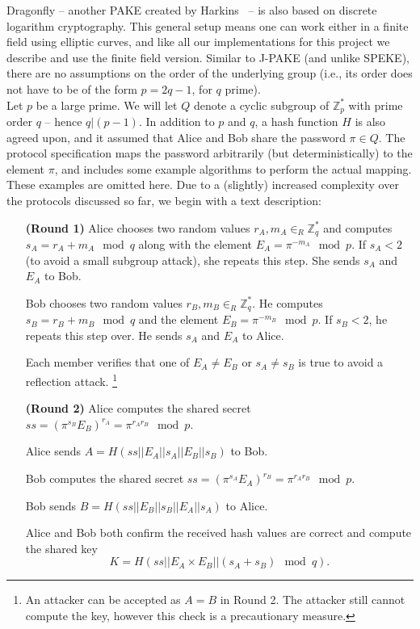 
Dragonfly -- another PAKE created by Harkins~\cite{Ha15} -- is also based on discrete logarithm cryptography.  This general setup means one can work  either in a finite field using elliptic curves, and like all our implementations for this project we describe and use the finite field version. 
Similar to J-PAKE (and unlike SPEKE), there are no assumptions on the order of the underlying group (i.e., its order does not have to be of the
form $p = 2q-1$, for $q$ prime).
\\

Let $p$ be a large prime. We will let $Q$ denote a cyclic subgroup of $\mathbb{Z}_p^*$ with prime order $q$ -- hence $q | (p-1)$. In addition to $p$ and $q$, a hash function $H$ is also agreed upon, and it assumed that Alice and Bob share the password $\pi \in Q$. The protocol specification maps the password
arbitrarily (but deterministically) to the element $\pi$, and includes some example algorithms to perform the actual mapping. These examples are omitted here. Due to a (slightly) increased complexity over the protocols discussed so far, we begin with a text description:

\begin{itemize}
    \item[\textbf{(Round 1)}] Alice chooses two random values $r_A, m_A \in_R \mathbb{Z}_q^*$ and computes $s_A = r_A + m_A \mod q$ along with the element
        $E_A = \pi^{-m_A} \mod p$. If $s_A < 2$ (to avoid a small subgroup attack), she repeats this step. She sends $s_A$ and $E_A$ to Bob.
        \label{enum:dragonfly2}
    \item[]
    \item[] Bob chooses two random values $r_B, m_B \in_R \mathbb{Z}_q^*$. He computes $s_B = r_B + m_B \mod q$ and the element
        $E_B = \pi^{-m_B} \mod p$. If $s_B < 2$, he repeats this step over. He sends $s_A$ and $E_A$ to Alice.
        \label{enum:dragonfly3}
    \item[]
    \item[] Each member verifies that one of $E_A \neq E_B$ or $s_A \neq s_B$ is true to avoid a reflection attack.
        \footnote{An attacker can be accepted as $A=B$ in Round 2. The attacker still cannot compute the key, however this check is a precautionary measure.}
    \item[]
    \item[\textbf{(Round 2)}] Alice computes the shared secret $ss = (\pi^{s_B} E_B)^{r_A} = \pi^{r_A r_B} \mod p$. 
    \item[] Alice sends $A = H(ss || E_A || s_A || E_B || s_B)$ to Bob.
    \item[]
    \item[] Bob computes the shared secret $ss = (\pi^{s_A} E_A)^{r_B} = \pi^{r_A r_B} \mod p$. 
    \item[] Bob sends $B = H(ss || E_B || s_B || E_A || s_A)$ to Alice.
    \item[]
    \item[] Alice and Bob both confirm the received hash values are correct and compute the shared key 
    \[ K = H(ss || E_A \times E_B || (s_A + s_B) \mod q).\]
\end{itemize}

